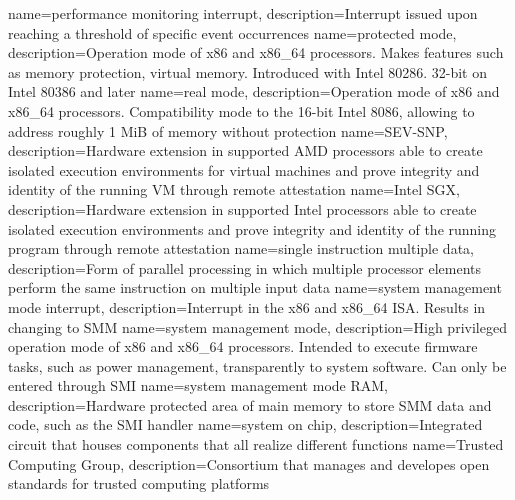 {
    name=performance monitoring interrupt,
    description={Interrupt issued upon reaching a threshold of specific event occurrences}
}
{
    name=protected mode,
    description={Operation mode of x86 and x86\_64 processors. Makes features such as memory protection, virtual memory.
            Introduced with Intel 80286. 32-bit on Intel 80386 and later}
}
%
{
    name=real mode,
    description={Operation mode of x86 and x86\_64 processors. Compatibility mode to the 16-bit Intel 8086, allowing to
            address roughly 1 MiB of memory without protection}
}
%
{
    name=SEV-SNP,
    description={Hardware extension in supported AMD processors able to create isolated execution environments for
            virtual machines and prove integrity and identity of the running VM through remote attestation}
}
{
    name=Intel SGX,
    description={Hardware extension in supported Intel processors able to create isolated execution environments and
            prove integrity and identity of the running program through remote attestation}
}
{
    name={single instruction multiple data},
    description={Form of parallel processing in which multiple processor elements perform the same instruction on
            multiple input data}
}
{
    name=system management mode interrupt,
    description={Interrupt in the x86 and x86\_64 ISA. Results in changing to SMM}
}
{
    name=system management mode,
    description={High privileged operation mode of x86 and x86\_64 processors. Intended to execute firmware tasks, such
            as power management, transparently to system software. Can only be entered through SMI}
}
{
    name=system management mode RAM,
    description={Hardware protected area of main memory to store SMM data and code, such as the
            SMI handler}
}
{
    name=system on chip,
    description={Integrated circuit that houses components that all realize different functions}
}
%
{
    name=Trusted Computing Group,
    description={Consortium that manages and developes open standards for trusted computing platforms}
}
